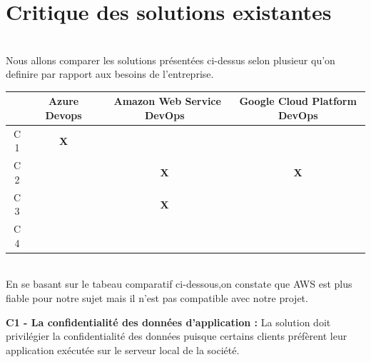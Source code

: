 \section{\LARGE Critique des solutions existantes}
\texttt{}\\[0.1cm]
\textsf{\selectfont{}
Nous allons comparer les solutions présentées ci-dessus selon plusieur qu'on definire par rapport aux besoins de l'entreprise.}\\[0.1cm]
\begin{tabular}{|c|c|c|c|}
\hline
 & Azure Devops & \ Amazon Web Service DevOps & Google Cloud Platform DevOps\\
\hline
C 1 & \textbf{X} &  & \\
\hline
C 2 & & \textbf{X} & \textbf{X} \\
\hline
C 3 & & \textbf{X} &  \\
\hline
C 4 & & & \\
\hline
\end{tabular}
\texttt{}\\[0.1cm]
\textsf{\selectfont{} En se basant sur le tabeau comparatif ci-dessous,on constate que AWS est plus fiable pour notre sujet mais il n'est pas compatible avec notre projet.}\\[0.1cm]
\par \noindent \textbf{\Large C1 - La confidentialité des données d'application : }\textsf{\selectfont{} La solution doit privilégier la confidentialité des données puisque certains clients préfèrent leur application exécutée sur le serveur local de la société.} \\[0.1cm]


